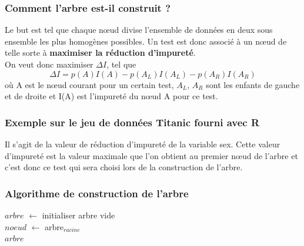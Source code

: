 \documentclass[compress]{beamer}
\begin{document}
\begin{frame}
\frametitle{Comment l'arbre est-il construit ?}
Le but est tel que chaque nœud divise l'ensemble de données en deux sous ensemble les plus homogènes possibles.
Un test est donc associé à un nœud de telle sorte à \textbf{maximiser la réduction d'impureté}.\\
On veut donc maximiser $\Delta I$, tel que
\[ \Delta I = p(A)I(A) - p(A_L)I(A_L) - p(A_R)I(A_R)\]
où A est le nœud courant pour un certain test, $A_L$, $A_R$ sont les enfants de gauche et de droite et I(A) est l'impureté du nœud A pour ce test.
\end{frame}

\begin{frame}
\frametitle{Exemple sur le jeu de données Titanic fourni avec R}

Il s'agit de la valeur de réduction d'impureté de la variable sex. Cette valeur d'impureté est la valeur maximale que l'on obtient au premier nœud de l'arbre et c'est donc ce test qui sera choisi lors de la construction de l'arbre.
\end{frame}

\begin{frame}
\frametitle{Algorithme de construction de l'arbre}
\begin{algorithm}[H]


$arbre$ $\leftarrow$ initialiser arbre vide \\
$noeud$ $\leftarrow$ arbre$_{racine}$ \\
\Retour $arbre$
\BlankLine
\end{algorithm}
\end{frame}
\end{document}
